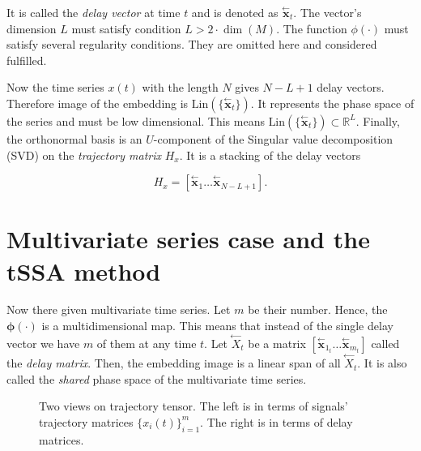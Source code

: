 \documentclass[referee, pdflatex, sn-mathphys-num]{sn-jnl}
\theoremstyle{definition}
\theoremstyle{plain}
\newcommand{\delayV}[1]{\overset{\leftarrow}{\mathbf{x}}_{#1}}
\newcommand{\delayM}[1]{\overset{\leftarrow}{X}_{#1}}
\begin{document}
	
	It is called the \emph{delay vector} at time $ t $ and is denoted as $ \delayV{t} $. The vector's dimension $ L $ must satisfy condition $ L > 2 \cdot \dim(M) $. The function $ \phi(\cdot) $ must satisfy several regularity conditions. They are omitted here and considered fulfilled.
	
	Now the time series $ x(t) $ with the length $ N $ gives $ N - L + 1 $ delay vectors. Therefore image of the embedding is $ \text{Lin}(\{\delayV{t}\}) $. It represents the phase space of the series and must be low dimensional. This means $ \text{Lin}(\{\delayV{t}\}) \subset \mathbb{R}^L $. Finally, the orthonormal basis is an $ U $-component of the Singular value decomposition (SVD) on the \emph{trajectory matrix} $ H_x $. It is a stacking of the delay vectors
	
	\[
		H_x = [ \delayV{1} \ldots  \delayV{N - L + 1}].
	\]
	
	\section{Multivariate series case and the tSSA method}\label{sec:tssa_method}
	
	Now there given multivariate time series. Let $ m $ be their number. Hence, the $ \boldsymbol{\phi}(\cdot) $ is a multidimensional map. This means that instead of the single delay vector we have $ m $ of them at any time $ t $. Let $ \delayM{t} $ be a matrix $ [ \delayV{1_t} \ldots \delayV{m_t} ] $ called the \emph{delay matrix}. Then, the embedding image is a linear span of all $ \delayM{t} $. It is also called the \emph{shared} phase space of the multivariate time series.
	
	\begin{figure}[h]
		\centering
		
		\caption{Two views on trajectory tensor. The left is in terms of signals' trajectory matrices $ \{x_i(t)\}_{i=1}^m $. The right is in terms of delay matrices.}\label{pic:traj_tensor}
	\end{figure}
	
\end{document}
